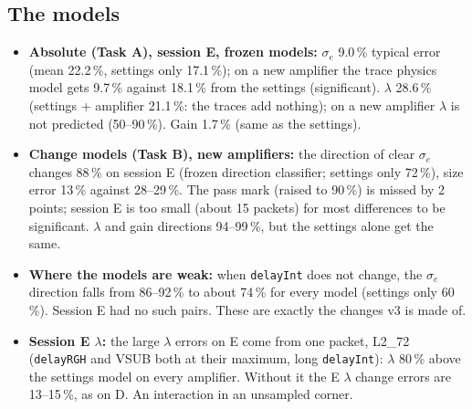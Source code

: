 \documentclass[11pt]{article}
\begin{document}
\subsection{The models}
\begin{itemize}
\item \textbf{Absolute (Task A), session E, frozen models:} $\sigma_e$ 9.0\,\% typical error (mean 22.2\,\%, settings only
  17.1\,\%); on a new amplifier the trace physics model gets 9.7\,\% against 18.1\,\% from the settings (significant).
  $\lambda$ 28.6\,\% (settings + amplifier 21.1\,\%: the traces add nothing); on a new amplifier $\lambda$ is not
  predicted (50--90\,\%). Gain 1.7\,\% (same as the settings).
\item \textbf{Change models (Task B), new amplifiers:} the direction of clear $\sigma_e$ changes 88\,\% on session E
  (frozen direction classifier; settings only 72\,\%), size error 13\,\% against 28--29\,\%. The pass mark (raised to
  90\,\%) is missed by 2 points; session E is too small (about 15 packets) for most differences to be significant.
  $\lambda$ and gain directions 94--99\,\%, but the settings alone get the same.
\item \textbf{Where the models are weak:} when \texttt{delayInt} does not change, the $\sigma_e$ direction falls from
  86--92\,\% to about 74\,\% for every model (settings only 60\,\%). Session E had no such pairs. These are exactly the
  changes v3 is made of.
\item \textbf{Session E $\lambda$:} the large $\lambda$ errors on E come from one packet, L2\_72 (\texttt{delayRGH} and
  VSUB both at their maximum, long \texttt{delayInt}): $\lambda$ 80\,\% above the settings model on every amplifier.
  Without it the E $\lambda$ change errors are 13--15\,\%, as on D. An interaction in an unsampled corner.
\end{itemize}
\end{document}
